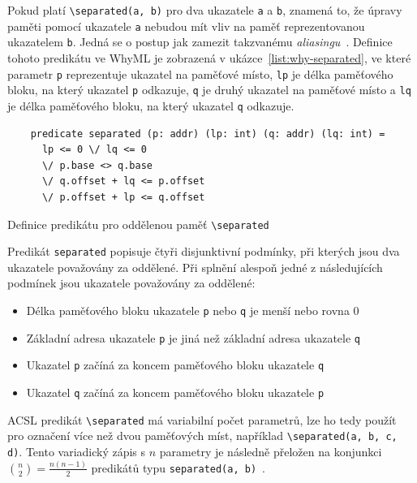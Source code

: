 
Pokud platí \texttt{\textbackslash separated(a, b)} pro dva ukazatele \texttt{a} a \texttt{b},
znamená to, že úpravy paměti pomocí ukazatele \texttt{a}
nebudou mít vliv na paměť reprezentovanou ukazatelem \texttt{b}.
Jedná se o postup jak zamezit takzvanému \textit{aliasingu}~\cite{ACSLSpec}.
Definice tohoto predikátu ve WhyML je zobrazená v ukázce~\ref{list:why-separated},
ve které parametr \texttt{p} reprezentuje ukazatel na paměťové místo,
\texttt{lp} je délka paměťového bloku, na který ukazatel \texttt{p} odkazuje,
\texttt{q} je druhý ukazatel na paměťové místo a \texttt{lq} je délka paměťového bloku,
na který ukazatel \texttt{q} odkazuje.

\begin{listing}[H]
    \begin{verbatim}
    predicate separated (p: addr) (lp: int) (q: addr) (lq: int) =
      lp <= 0 \/ lq <= 0
      \/ p.base <> q.base
      \/ q.offset + lq <= p.offset
      \/ p.offset + lp <= q.offset
    \end{verbatim}
    \caption{Definice predikátu pro oddělenou paměť \texttt{\textbackslash separated}}
    \label{list:why-separated}
\end{listing}

Predikát \texttt{separated} popisuje čtyři disjunktivní podmínky,
při kterých jsou dva ukazatele považovány za oddělené.
Při splnění alespoň jedné z následujících podmínek
jsou ukazatele považovány za oddělené:

\begin{itemize}
    \item Délka paměťového bloku ukazatele \texttt{p} nebo \texttt{q} je menší nebo rovna 0
    \item Základní adresa ukazatele \texttt{p} je jiná než základní adresa ukazatele \texttt{q}
    \item Ukazatel \texttt{p} začíná za koncem paměťového bloku ukazatele \texttt{q}
    \item Ukazatel \texttt{q} začíná za koncem paměťového bloku ukazatele \texttt{p}
\end{itemize}

ACSL predikát \texttt{\textbackslash separated} má variabilní počet parametrů,
lze ho tedy použít pro označení více než dvou paměťových míst, například
\texttt{\textbackslash separated(a, b, c, d)}.
Tento variadický zápis s $n$ parametry
je následně přeložen na konjunkci $\binom{n}{2} = \frac{n(n-1)}{2}$ predikátů typu \texttt{separated(a, b)}~\cite{Correnson2018Separated}.


